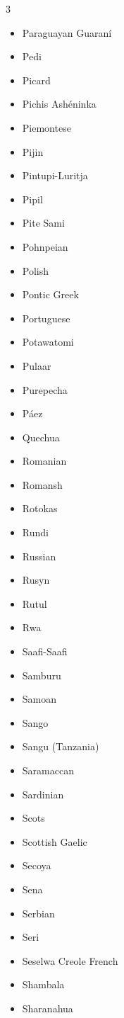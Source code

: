 \documentclass[paper=a4, 10pt]{scrbook}
\begin{document}
\begin{multicols}{3}
\begin{itemize}
        \item Paraguayan Guaraní
        \item Pedi
        \item Picard
        \item Pichis Ashéninka
        \item Piemontese
        \item Pijin
        \item Pintupi-Luritja
        \item Pipil
        \item Pite Sami
        \item Pohnpeian
        \item Polish
        \item Pontic Greek
        \item Portuguese
        \item Potawatomi
        \item Pulaar
        \item Purepecha
        \item Páez
        \item Quechua
        \item Romanian
        \item Romansh
        \item Rotokas
        \item Rundi
        \item Russian
        \item Rusyn
        \item Rutul
        \item Rwa
        \item Saafi-Saafi
        \item Samburu
        \item Samoan
        \item Sango
        \item Sangu (Tanzania)
        \item Saramaccan
        \item Sardinian
        \item Scots
        \item Scottish Gaelic
        \item Secoya
        \item Sena
        \item Serbian
        \item Seri
        \item Seselwa Creole French
        \item Shambala
        \item Sharanahua

\end{itemize}
\end{multicols}
\end{document}
